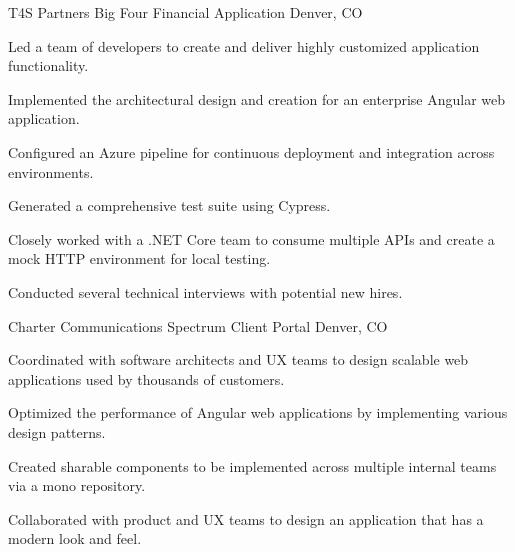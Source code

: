 \begin{cventries}
    \cventry
    {T4S Partners} %
    {Big Four Financial Application} %
    {Denver, CO} %
    {} %
    {
    \begin{cvitems} %
        \item {Led a team of developers to create and deliver highly customized application functionality.}
        \item {Implemented the architectural design and creation for an enterprise Angular web application.}
        \item {Configured an Azure pipeline for continuous deployment and integration across environments.}
        \item {Generated a comprehensive test suite using Cypress.}
        \item {Closely worked with a .NET Core team to consume multiple APIs and create a mock HTTP environment for local testing.}
        \item {Conducted several technical interviews with potential new hires.}
    \end{cvitems}
    }

    \cventry
    {Charter Communications} %
    {Spectrum Client Portal} %
    {Denver, CO} %
    {} %
    {
    \begin{cvitems} %
        \item {Coordinated with software architects and UX teams to design scalable web applications used by thousands of customers.}
        \item {Optimized the performance of Angular web applications by implementing various design patterns.}
        \item {Created sharable components to be implemented across multiple internal teams via a mono repository.}
        \item {Collaborated with product and UX teams to design an application that has a modern look and feel.}
    \end{cvitems}
    }


\end{cventries}
